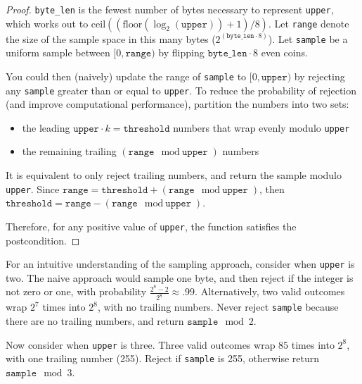 \documentclass{article}
\begin{document}
\begin{proof}
\texttt{byte\_len} is the fewest number of bytes necessary to represent \texttt{upper},
which works out to $\mathrm{ceil}((\mathrm{floor}(\log_2(\texttt{upper})) + 1) / 8)$.
Let \texttt{range} denote the size of the sample space in this many bytes ($2^{(\texttt{byte\_len} \cdot 8)}$).
Let \texttt{sample} be a uniform sample between $[0, \texttt{range})$ by flipping $\texttt{byte\_len} \cdot 8$ even coins.

You could then (naively) update the range of \texttt{sample} to $[0, \texttt{upper})$ by rejecting any \texttt{sample} greater than or equal to \texttt{upper}.
To reduce the probability of rejection (and improve computational performance),
partition the numbers into two sets:\

\begin{itemize}
    \item the leading $\texttt{upper} \cdot k = \texttt{threshold}$ numbers that wrap evenly modulo \texttt{upper}
    \item the remaining trailing $(\texttt{range} \mod \texttt{upper})$ numbers
\end{itemize}

It is equivalent to only reject trailing numbers,
and return the sample modulo \texttt{upper}.
Since $\texttt{range} = \texttt{threshold} + (\texttt{range} \mod \texttt{upper})$,
then $\texttt{threshold} = \texttt{range} - (\texttt{range} \mod \texttt{upper})$.

\noindent Therefore, for any positive value of \texttt{upper}, the function satisfies the postcondition.
\end{proof}

For an intuitive understanding of the sampling approach, consider when \texttt{upper} is two.
The naive approach would sample one byte, and then reject if the integer is not zero or one,
with probability $\frac{2^8 - 2}{2^8} \approx .99$.
Alternatively, two valid outcomes wrap $2^7$ times into $2^8$, with no trailing numbers.
Never reject \texttt{sample} because there are no trailing numbers, and return $\texttt{sample} \mod 2$.

Now consider when \texttt{upper} is three.
Three valid outcomes wrap $85$ times into $2^8$, with one trailing number (255).
Reject if \texttt{sample} is 255, otherwise return $\texttt{sample} \mod 3$.
\end{document}
